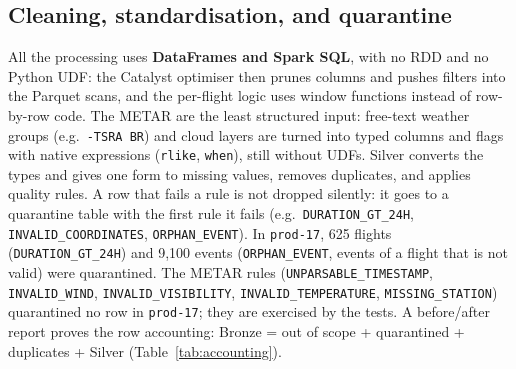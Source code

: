 \documentclass[11pt,a4paper]{article}
\begin{document}
\subsection{Cleaning, standardisation, and quarantine}
All the processing uses \textbf{DataFrames and Spark SQL}, with no RDD and no Python UDF: the Catalyst optimiser then prunes columns and pushes filters into the Parquet scans, and the per-flight logic uses window functions instead of row-by-row code. The METAR are the least structured input: free-text weather groups (e.g.\ \texttt{-TSRA BR}) and cloud layers are turned into typed columns and flags with native expressions (\texttt{rlike}, \texttt{when}), still without UDFs. Silver converts the types and gives one form to missing values, removes duplicates, and applies quality rules. A row that fails a rule is not dropped silently: it goes to a quarantine table with the first rule it fails (e.g.\ \texttt{DURATION\_GT\_24H}, \texttt{INVALID\_COORDINATES}, \texttt{ORPHAN\_EVENT}). In \texttt{prod-17}, 625 flights (\texttt{DURATION\_GT\_24H}) and 9,100 events (\texttt{ORPHAN\_EVENT}, events of a flight that is not valid) were quarantined. The METAR rules (\texttt{UNPARSABLE\_TIMESTAMP}, \texttt{INVALID\_WIND}, \texttt{INVALID\_VISIBILITY}, \texttt{INVALID\_TEMPERATURE}, \texttt{MISSING\_STATION}) quarantined no row in \texttt{prod-17}; they are exercised by the tests. A before/after report proves the row accounting: Bronze = out of scope + quarantined + duplicates + Silver (Table~\ref{tab:accounting}).
\end{document}
